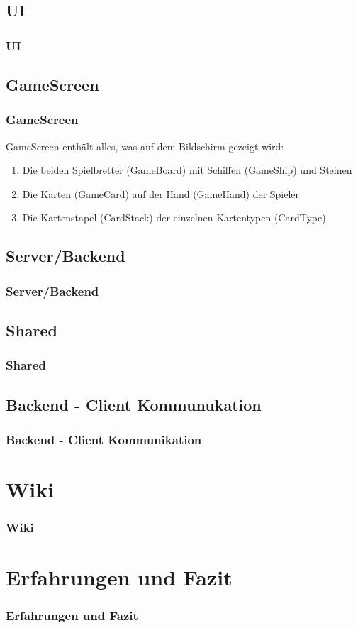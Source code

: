 \documentclass{beamer}
\begin{document}
\subsection{UI}
\begin{frame}
  \frametitle{UI}
\end{frame}

\subsection{GameScreen}
\begin{frame}
\frametitle{GameScreen}
  GameScreen enthält alles, was auf dem Bildschirm gezeigt wird:
  \begin{enumerate}
    \item Die beiden Spielbretter (GameBoard) mit Schiffen (GameShip) und Steinen
    \item Die Karten (GameCard) auf der Hand (GameHand) der Spieler
    \item Die Kartenstapel (CardStack) der einzelnen Kartentypen (CardType)
  \end{enumerate}
\end{frame}


\subsection{Server/Backend}
\begin{frame}
\frametitle{Server/Backend}
\end{frame}

\subsection{Shared}
\begin{frame}
\frametitle{Shared}
\end{frame}

\subsection{Backend - Client Kommunukation}
\begin{frame}
\frametitle{Backend - Client Kommunikation}
\end{frame}

\section{Wiki}
\begin{frame}
\frametitle{Wiki}

\end{frame}

\section{Erfahrungen und Fazit}
\begin{frame}
\frametitle{Erfahrungen und Fazit}

\end{frame}
\end{document}
